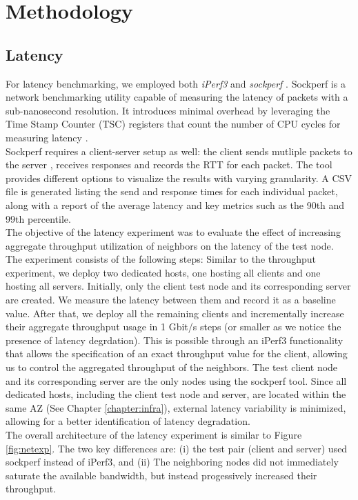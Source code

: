 \section{Methodology}

\subsection{Latency}
For latency benchmarking, we employed both \textit{iPerf3} and \textit{sockperf} \cite{sockperf}. 
Sockperf is a network benchmarking utility capable of measuring the latency of packets with a 
sub-nanosecond resolution. It introduces minimal overhead by leveraging the Time Stamp Counter (TSC) 
registers that count the number of CPU cycles for measuring latency \cite{sockperf}. \\
Sockperf requires a client-server setup as well: the client sends mutliple packets to the server
, receives responses and records the \ac{RTT} for each packet. 
The tool provides different options to visualize the results with varying granularity. 
A CSV file is generated listing the send and response times for each individual packet,
along with a report of the average latency and key metrics such as the 90th and 99th percentile. \\
The objective of the latency experiment was to evaluate the effect of increasing aggregate throughput 
utilization of neighbors on the latency of the test node. The experiment
consists of the following steps: Similar to the throughput experiment, we deploy two dedicated hosts, 
one hosting all clients and one hosting all servers. Initially, only the client test node 
and its corresponding server are created. We measure the latency between them and record it as a baseline 
value. After that, we deploy all the remaining clients and incrementally increase their aggregate 
throughput usage in 1 Gbit/s steps (or smaller as we notice the presence of latency degrdation).
This is possible through an iPerf3 functionality that allows the specification of an exact throughput 
value for the client, allowing us to control the aggregated throughput of the neighbors.
The test client node and its corresponding server are the only nodes using the sockperf tool. 
Since all dedicated hosts, including the client test node and server, are located within 
the same \ac{AZ} (See Chapter \ref{chapter:infra}), 
external latency variability is minimized, allowing for a better identification of latency degradation. \\
The overall architecture of the latency experiment is similar to Figure \ref{fig:netexp}. The two 
key differences are: (i) the test pair (client and server) used sockperf instead of iPerf3, and 
(ii) The neighboring nodes did not immediately saturate the available bandwidth, 
but instead progessively increased their throughput. 

